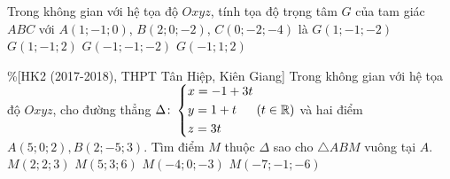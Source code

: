 \begin{ex}%
	Trong không gian với hệ tọa độ $Oxyz$, tính tọa độ trọng tâm $G$ của tam giác $ABC$ với $A(1;-1;0)$, $B(2;0;-2)$, $C(0;-2;-4)$ là
	\choice
	{\True $G\left(1;-1;-2\right)$}
	{$G\left(1;-1;2\right)$}
	{$G\left(-1;-1;-2\right)$}
	{$G\left(-1;1;2\right)$}
\end{ex}

\begin{ex}\%[HK2 (2017-2018), THPT Tân Hiệp, Kiên Giang]%
	Trong không gian với hệ tọa độ $Oxyz$, cho đường thẳng $\Delta\colon \left\{\begin{aligned}&x=-1+3t\\&y=1+t\\&z=3t\end{aligned}\right. \left(t\in \mathbb{R}\right)$ và hai điểm $A(5;0;2),B(2;-5;3)$. Tìm điểm $M$ thuộc $\Delta$ sao cho $\triangle ABM$ vuông tại $A$.
	\choice
	{\True $M(2;2;3)$}
	{$M(5;3;6)$}
	{$M(-4;0;-3)$}
	{$M(-7;-1;-6)$}
\end{ex}

